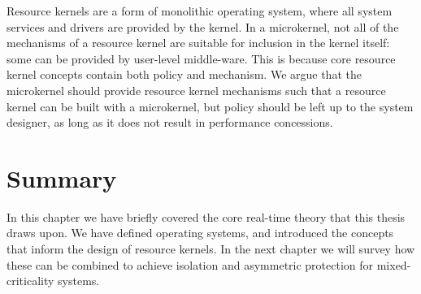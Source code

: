 Resource kernels are a form of monolithic operating system, where all system services and drivers are provided by the kernel.
In a microkernel, not all of the mechanisms of a resource kernel are suitable for inclusion in the kernel itself: some can be provided by user-level middle-ware.
This is because core resource kernel concepts contain both policy and mechanism.
We argue that the microkernel should provide resource kernel mechanisms such that a resource kernel can be built with a microkernel, but policy should be left up to the system designer, as long as it does not result in performance concessions.

\section{Summary}

In this chapter we have briefly covered the core real-time theory that this thesis draws upon.
We have defined operating systems, and introduced the concepts that inform the design of resource kernels.
In the next chapter we will survey how these can be combined to achieve isolation and asymmetric protection for mixed-criticality systems.
